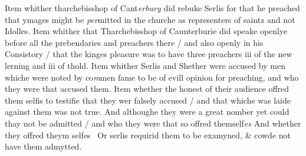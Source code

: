 \documentclass[12pt, a4paper]{book}
\begin{document}
				\marginpar[\vspace{0.5cm}{\textcolor{Gray}{4}}]{}
			 Item whither tharchebisshop of Cant\textit{erbury} did rebuke Serlis for that he preached that ymages might be\textit{ per}mitted in the churche as representers of saintz and not Idolles.  
				\marginpar[\vspace{0.5cm}{\textcolor{Gray}{5}}]{}
			 Item whither that Tharchebisshop of Caunterburie did speake openlye before all the prebendaries and preachers there / and also openly in his  Consistory / that the kinges pleasure was to have three preachers  iii of the new lerning and iii of thold. 
				\marginpar[\vspace{0.5cm}{\textcolor{Gray}{6}}]{}
			 Item whither Serlis and Shether were accused by men whiche were noted by co\textit{m}men fame to be of evill opinion for preaching, and  who they were that accused them.  
				\marginpar[\vspace{0.5cm}{\textcolor{Gray}{7}}]{}
			 Item whether the honest of their audience offred them selfis to testifie that they wer falsely accused / and that whiche was laide against them was not true. And althoughe they were a great nomber yet could thay
			 not be admitted / and who they were that so offred themself\textit{es}
               And whether they offred theym selfes 
			 Or serlis requirid them to be examyned, \& cowde not have them admytted.   
			 
\end{document}
